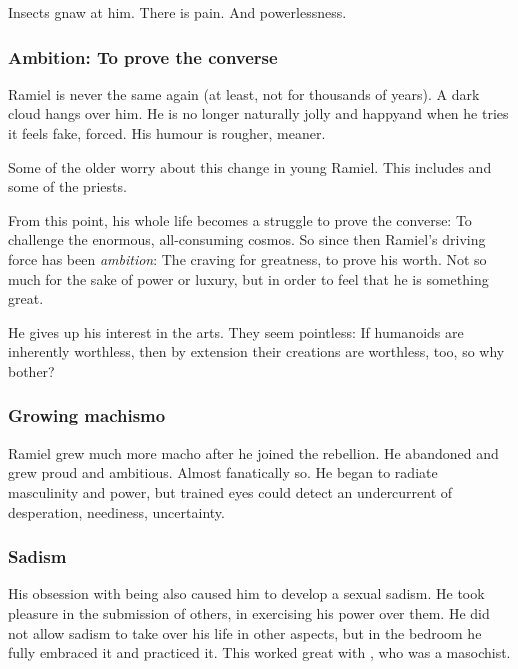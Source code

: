 Insects gnaw at him. 
There is pain. 
And powerlessness. 






\subsubsection{Ambition: To prove the converse}
Ramiel is never the same again (at least, not for thousands of years). 
A dark cloud hangs over him. 
He is no longer naturally jolly and happy\dash and when he tries it feels fake, forced. 
His humour is rougher, meaner. 

Some of the older \resphain{} worry about this change in young Ramiel. 
This includes \Sithiyacaan{} and some of the priests. 

From this point, his whole life becomes a struggle to prove the converse: 
To challenge the enormous, all-consuming cosmos. 
So since then Ramiel's driving force has been \emph{ambition}: 
The craving for greatness, to prove his worth. 
Not so much for the sake of power or luxury, but in order to feel that he is something great. 

He gives up his interest in the arts. 
They seem pointless: 
If humanoids are inherently worthless, then by extension their creations are worthless, too, so why bother? 





\subsubsection{Growing machismo}
Ramiel grew much more macho after he joined the rebellion. 
He abandoned  and grew proud and ambitious. 
Almost fanatically so. 
He began to radiate masculinity and power, but trained eyes could detect an undercurrent of desperation, neediness, uncertainty. 





\subsubsection{Sadism}
His obsession with being  also caused him to develop a sexual sadism. 
He took pleasure in the submission of others, in exercising his power over them. 
He did not allow sadism to take over his life in other aspects, but in the bedroom he fully embraced it and practiced it. 
This worked great with \Shiaraid, who was a masochist.






